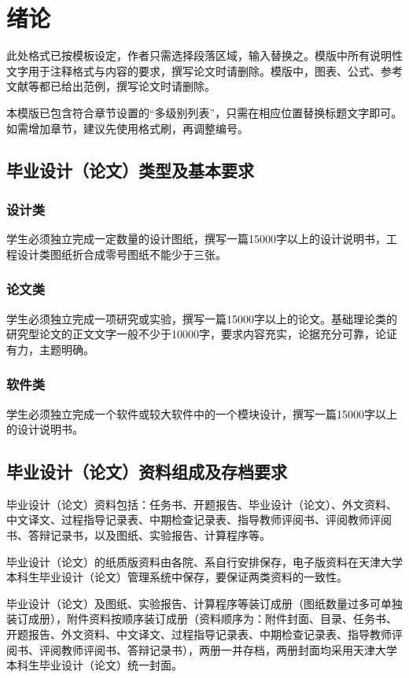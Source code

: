 

\chapter{绪论}

此处格式已按模板设定，作者只需选择段落区域，输入替换之。模版中所有说明性文字用于注释格式与内容的要求，撰写论文时请删除。模版中，图表、公式、参考文献等都已给出范例，撰写论文时请删除。

本模版已包含符合章节设置的“多级别列表”，只需在相应位置替换标题文字即可。如需增加章节，建议先使用格式刷，再调整编号。

\section{毕业设计（论文）类型及基本要求}

\subsection{设计类}

学生必须独立完成一定数量的设计图纸，撰写一篇15000字以上的设计说明书，工程设计类图纸折合成零号图纸不能少于三张。

\subsection{论文类}

学生必须独立完成一项研究或实验，撰写一篇15000字以上的论文。基础理论类的研究型论文的正文文字一般不少于10000字，要求内容充实，论据充分可靠，论证有力，主题明确。

\subsection{软件类}

学生必须独立完成一个软件或较大软件中的一个模块设计，撰写一篇15000字以上的设计说明书。

\section{毕业设计（论文）资料组成及存档要求}

毕业设计（论文）资料包括：任务书、开题报告、毕业设计（论文）、外文资料、中文译文、过程指导记录表、中期检查记录表、指导教师评阅书、评阅教师评阅书、答辩记录书，以及图纸、实验报告、计算程序等。

毕业设计（论文）的纸质版资料由各院、系自行安排保存，电子版资料在天津大学本科生毕业设计（论文）管理系统中保存，要保证两类资料的一致性。

毕业设计（论文）及图纸、实验报告、计算程序等装订成册（图纸数量过多可单独装订成册），附件资料按顺序装订成册（资料顺序为：附件封面、目录、任务书、开题报告、外文资料、中文译文、过程指导记录表、中期检查记录表、指导教师评阅书、评阅教师评阅书、答辩记录书），两册一并存档，两册封面均采用天津大学本科生毕业设计（论文）统一封面。
